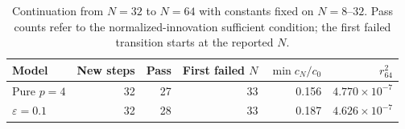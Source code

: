 \begin{table}[!htbp]
\centering\small
\caption{Continuation from $N=32$ to $N=64$ with constants fixed on $N=8$--$32$. Pass counts refer to the normalized-innovation sufficient condition; the first failed transition starts at the reported $N$.}
\label{tab:revision-continuation}
\begin{tabular}{@{}lrrrrr@{}}
\toprule
Model & New steps & Pass & First failed $N$ & $\min c_N/c_0$ & $r_{64}^2$ \\
\midrule
Pure $p=4$ & 32 & 27 & 33 & 0.156 & $4.770\times10^{-7}$ \\
$\varepsilon=0.1$ & 32 & 28 & 33 & 0.187 & $4.626\times10^{-7}$ \\
\bottomrule
\end{tabular}
\end{table}
